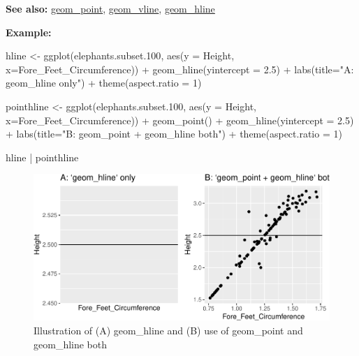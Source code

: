 \documentclass[
]{book}
\newenvironment{Shaded}{\begin{snugshade}}{\end{snugshade}}
\newcommand{\AttributeTok}[1]{\textcolor[rgb]{0.77,0.63,0.00}{#1}}
\newcommand{\DecValTok}[1]{\textcolor[rgb]{0.00,0.00,0.81}{#1}}
\newcommand{\FloatTok}[1]{\textcolor[rgb]{0.00,0.00,0.81}{#1}}
\newcommand{\FunctionTok}[1]{\textcolor[rgb]{0.00,0.00,0.00}{#1}}
\newcommand{\NormalTok}[1]{#1}
\newcommand{\OtherTok}[1]{\textcolor[rgb]{0.56,0.35,0.01}{#1}}
\newcommand{\SpecialCharTok}[1]{\textcolor[rgb]{0.00,0.00,0.00}{#1}}
\newcommand{\StringTok}[1]{\textcolor[rgb]{0.31,0.60,0.02}{#1}}
\begin{document}
\textbf{See also: } \protect\hyperlink{point}{geom\_point}, \protect\hyperlink{vline}{geom\_vline}, \protect\hyperlink{hline}{geom\_hline}

\textbf{Example:}

\begin{Shaded}
\begin{Highlighting}[]
\NormalTok{hline }\OtherTok{\textless{}{-}} \FunctionTok{ggplot}\NormalTok{(elephants.subset}\FloatTok{.100}\NormalTok{, }\FunctionTok{aes}\NormalTok{(}\AttributeTok{y =}\NormalTok{ Height, }\AttributeTok{x=}\NormalTok{Fore\_Feet\_Circumference)) }\SpecialCharTok{+} \FunctionTok{geom\_hline}\NormalTok{(}\AttributeTok{yintercept =} \FloatTok{2.5}\NormalTok{) }\SpecialCharTok{+} 
  \FunctionTok{labs}\NormalTok{(}\AttributeTok{title=}\StringTok{"A: \textasciigrave{}geom\_hline\textasciigrave{} only"}\NormalTok{) }\SpecialCharTok{+}
  \FunctionTok{theme}\NormalTok{(}\AttributeTok{aspect.ratio =} \DecValTok{1}\NormalTok{)}

\NormalTok{pointhline }\OtherTok{\textless{}{-}} \FunctionTok{ggplot}\NormalTok{(elephants.subset}\FloatTok{.100}\NormalTok{, }\FunctionTok{aes}\NormalTok{(}\AttributeTok{y =}\NormalTok{ Height, }\AttributeTok{x=}\NormalTok{Fore\_Feet\_Circumference)) }\SpecialCharTok{+} 
  \FunctionTok{geom\_point}\NormalTok{() }\SpecialCharTok{+} 
  \FunctionTok{geom\_hline}\NormalTok{(}\AttributeTok{yintercept =} \FloatTok{2.5}\NormalTok{) }\SpecialCharTok{+} 
  \FunctionTok{labs}\NormalTok{(}\AttributeTok{title=}\StringTok{"B: \textasciigrave{}geom\_point + geom\_hline\textasciigrave{} both"}\NormalTok{) }\SpecialCharTok{+}
  \FunctionTok{theme}\NormalTok{(}\AttributeTok{aspect.ratio =} \DecValTok{1}\NormalTok{)}


\NormalTok{hline }\SpecialCharTok{|}\NormalTok{ pointhline}
\end{Highlighting}
\end{Shaded}

\begin{figure}
\centering
\includegraphics{Data-Visualisation-geom-Encyclopedia_files/figure-latex/unnamed-chunk-40-1.pdf}
\caption{\label{fig:unnamed-chunk-40}Illustration of (A) geom\_hline and (B) use of geom\_point and geom\_hline both}
\end{figure}
\end{document}
